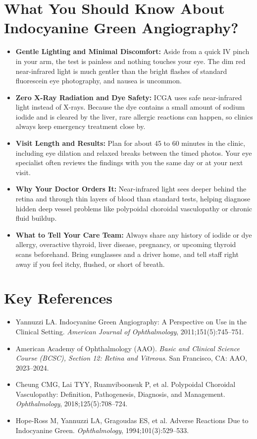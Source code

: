\section{What You Should Know About Indocyanine Green Angiography?}

\begin{itemize}
    \item \textbf{Gentle Lighting and Minimal Discomfort:} Aside from a quick IV pinch in your arm, the test is painless and nothing touches your eye. The dim red near-infrared light is much gentler than the bright flashes of standard fluorescein eye photography, and nausea is uncommon.
    \item \textbf{Zero X-Ray Radiation and Dye Safety:} ICGA uses safe near-infrared light instead of X-rays. Because the dye contains a small amount of sodium iodide and is cleared by the liver, rare allergic reactions can happen, so clinics always keep emergency treatment close by.
    \item \textbf{Visit Length and Results:} Plan for about 45 to 60 minutes in the clinic, including eye dilation and relaxed breaks between the timed photos. Your eye specialist often reviews the findings with you the same day or at your next visit.
    \item \textbf{Why Your Doctor Orders It:} Near-infrared light sees deeper behind the retina and through thin layers of blood than standard tests, helping diagnose hidden deep vessel problems like polypoidal choroidal vasculopathy or chronic fluid buildup.
    \item \textbf{What to Tell Your Care Team:} Always share any history of iodide or dye allergy, overactive thyroid, liver disease, pregnancy, or upcoming thyroid scans beforehand. Bring sunglasses and a driver home, and tell staff right away if you feel itchy, flushed, or short of breath.
\end{itemize}

\section{Key References}

\begin{itemize}
    \item Yannuzzi LA. Indocyanine Green Angiography: A Perspective on Use in the Clinical Setting. \textit{American Journal of Ophthalmology}, 2011;151(5):745--751.
    \item American Academy of Ophthalmology (AAO). \textit{Basic and Clinical Science Course (BCSC), Section 12: Retina and Vitreous}. San Francisco, CA: AAO, 2023--2024.
    \item Cheung CMG, Lai TYY, Ruamviboonsuk P, et al. Polypoidal Choroidal Vasculopathy: Definition, Pathogenesis, Diagnosis, and Management. \textit{Ophthalmology}, 2018;125(5):708--724.
    \item Hope-Ross M, Yannuzzi LA, Gragoudas ES, et al. Adverse Reactions Due to Indocyanine Green. \textit{Ophthalmology}, 1994;101(3):529--533.
\end{itemize}
